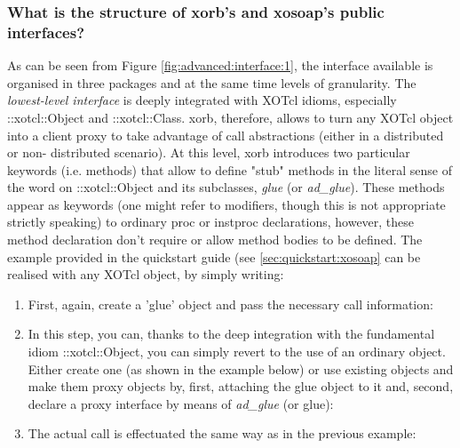   \subsubsection{What is the structure of xorb's and xosoap's public interfaces?}\label{sec:advanced:interface:what}
  As can be seen from Figure \ref{fig:advanced:interface:1}, the interface available is organised in three 
packages and at the same time levels of granularity. The \emph{lowest-level interface} is deeply 
integrated with XOTcl idioms, especially ::xotcl::Object and ::xotcl::Class. xorb, therefore, allows to turn 
any XOTcl object into a client proxy to take advantage of call abstractions (either in a distributed or non-
distributed scenario). At this level, xorb introduces two particular keywords (i.e. methods) that allow to 
define "stub" methods in the literal sense of the word on ::xotcl::Object and its subclasses, \emph{glue} 
(or \emph{ad\_glue}). These methods appear as keywords (one might refer to modifiers, though this is 
not appropriate strictly speaking) to ordinary proc or instproc declarations, however, these method 
declaration don't require or allow method bodies to be defined. The example provided in the quickstart 
guide (see \ref{sec:quickstart:xosoap} can be realised with any XOTcl object, by simply writing:
  \begin{enumerate}
\item First, again, create a 'glue' object and pass the necessary call information: 
\item In this step, you can, thanks to the deep integration with the fundamental idiom ::xotcl::Object, you 
can simply revert to the use of an ordinary object. Either create one (as shown in the example below) or 
use existing objects and make them proxy objects by, first, attaching the glue object to it and, second, 
declare a proxy interface by means of \emph{ad\_glue} (or glue):


\item The actual call is effectuated the same way as in the previous example:

  \end{enumerate}
